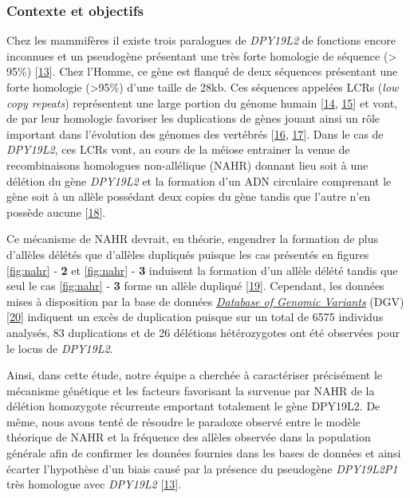\documentclass[12pt,twoside]{reedthesis}
\begin{document}
  \subsubsection{Contexte et objectifs}\label{contexte-et-objectifs}
  
  Chez les mammifères il existe trois paralogues de \emph{DPY19L2} de
  fonctions encore inconnues et un pseudogène présentant une très forte
  homologie de séquence (\textgreater{} 95\%)
  {[}\protect\hyperlink{ref-Carson2006}{13}{]}. Chez l'Homme, ce gène est
  flanqué de deux séquences présentant une forte homologie
  (\textgreater{}95\%) d'une taille de 28kb. Ces séquences appelées LCRs
  (\emph{low copy repeats}) représentent une large portion du génome
  humain {[}\protect\hyperlink{ref-Cheung2003}{14},
  \protect\hyperlink{ref-Bailey2002}{15}{]} et vont, de par leur homologie
  favoriser les duplications de gènes jouant ainsi un rôle important dans
  l'évolution des génomes des vertébrés
  {[}\protect\hyperlink{ref-Walsh2003}{16},
  \protect\hyperlink{ref-Ohno1970}{17}{]}. Dans le cas de \emph{DPY19L2},
  ces LCRs vont, au cours de la méiose entrainer la venue de
  recombinaisons homologues non-allélique (NAHR) donnant lieu soit à une
  délétion du gène \emph{DPY19L2} et la formation d'un ADN circulaire
  comprenant le gène soit à un allèle possédant deux copies du gène tandis
  que l'autre n'en possède aucune
  {[}\protect\hyperlink{ref-Harbuz2011a}{18}{]}.
  
  Ce mécanisme de NAHR devrait, en théorie, engendrer la formation de plus
  d'allèles délétés que d'allèles dupliqués puisque les cas présentés en
  figures \ref{fig:nahr} - \textbf{2} et \ref{fig:nahr} - \textbf{3}
  induisent la formation d'un allèle délété tandis que seul le cas
  \ref{fig:nahr} - \textbf{3} forme un allèle dupliqué
  {[}\protect\hyperlink{ref-Liu2012}{19}{]}. Cependant, les données mises
  à disposition par la base de données
  \href{http://dgv.tcag.ca/dgv/app/home}{\emph{Database of Genomic
  Variants}} (DGV) {[}\protect\hyperlink{ref-MacDonald2014}{20}{]}
  indiquent un excès de duplication puisque sur un total de 6575 individus
  analysés, 83 duplications et de 26 délétions hétérozygotes ont été
  observées pour le locus de \emph{DPY19L2}.
  
  Ainsi, dans cette étude, notre équipe a cherchée à caractériser
  précisément le mécanisme génétique et les facteurs favorisant la
  survenue par NAHR de la délétion homozygote récurrente emportant
  totalement le gène DPY19L2. De même, nous avons tenté de résoudre le
  paradoxe observé entre le modèle théorique de NAHR et la fréquence des
  allèles observée dans la population générale afin de confirmer les
  données fournies dans les bases de données et ainsi écarter l'hypothèse
  d'un biais causé par la présence du pseudogène \emph{DPY19L2P1} très
  homologue avec \emph{DPY19L2}
  {[}\protect\hyperlink{ref-Carson2006}{13}{]}.
  
\end{document}
